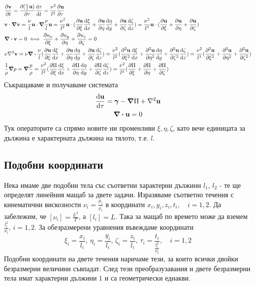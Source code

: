 \begin{align}
	&\pdv{\mathbf{v}}{t} = \pdv{(\frac{\nu}{l}\mathbf{u})}{\tau}\dv{\tau}{t} = \frac{\nu^2}{l^3} \pdv{\mathbf{u}}{\tau} \\
	&\mathbf{v} \cdot \grad \mathbf{v} = 
		\frac{\nu}{l} \mathbf{u} \cdot \grad \frac{\nu}{l} \mathbf{u} = 
		\frac{\nu^2}{l^2} \mathbf{u} \cdot (\pdv{\mathbf{u}}{\xi}\dv{\xi}{x} + \pdv{\mathbf{u}}{\eta}\dv{\eta}{y} + \pdv{\mathbf{u}}{\zeta}\dv{\zeta}{z}) =
		\frac{\nu^2}{l^3} \mathbf{u} \cdot (\pdv{\mathbf{u}}{\xi} + \pdv{\mathbf{u}}{\eta} + \pdv{\mathbf{u}}{\zeta}) \\
	& \div \mathbf{v} = 0 \iff \pdv{u_x}{\xi} + \pdv{u_y}{\eta} + \pdv{u_z}{\zeta} = 0 \\
	& \nu \laplacian \mathbf{v} = 
		\nu \div \frac{\nu}{l} (\pdv{\mathbf{u}}{\xi}\dv{\xi}{x} + \pdv{\mathbf{u}}{\eta}\dv{\eta}{y} + \pdv{\mathbf{u}}{\zeta}\dv{\zeta}{z}) = 
		\frac{\nu^2}{l^2} (\pdv[2]{\mathbf{u}}{\xi}\dv{\xi}{x} + \pdv[2]{\mathbf{u}}{\eta}\dv{\eta}{y} + \pdv[2]{\mathbf{u}}{\zeta}\dv{\zeta}{z}) =
		\frac{\nu^2}{l^3} (\pdv[2]{\mathbf{u}}{\xi} + \pdv[2]{\mathbf{u}}{\eta} + \pdv[2]{\mathbf{u}}{\zeta}) \\
	&\frac{1}{\rho}\grad p = 
		\grad \frac{p}{\rho} =
	 	\frac{\nu^2}{l^2} (\pdv{\Pi}{\xi}\dv{\xi}{x} + \pdv{\Pi}{\eta}\dv{\eta}{y} + \pdv{\Pi}{\zeta}\dv{\zeta}{z}) =
		\frac{\nu^2}{l^3} (\pdv{\Pi}{\xi} + \pdv{\Pi}{\eta} + \pdv{\Pi}{\zeta})
\end{align}
Съкращаваме и получаваме системата
\begin{gather}
	\dv{\mathbf{u}}{\tau} = \bm{\gamma} - \grad \Pi + \laplacian \mathbf{u} \\\nonumber
	\div \mathbf{u} = 0
\end{gather}
Тук операторите са спрямо новите ни променливи $\xi, \eta, \zeta$, като вече единицата за дължина е характерната дължина на тялото, т.е. $l$.

\subsection{Подобни координати}
Нека имаме две подобни тела със съответни характерни дължини $l_1$, $l_2$ - те ще определят линейния мащаб за двете задачи. 
Изразяваме съответно течения с кинематични вискозности $\nu_i = \frac{\mu_i}{\rho_i}$ в координати $x_i,y_i,z_i,t_i, \quad i=1,2$.
Да забележим, че $[\nu_i]=\frac{L^2}{T}$, а $[l_i]=L$.
Така за мащаб по времето може да вземем $\frac{l_i^2}{\nu_i},\, i=1,2$. 
За обезразмерени уравнения въвеждаме координати
\begin{equation}
	\xi_i = \frac{x_i}{l_i},\, \eta_i = \frac{y_i}{l_i},\, \zeta_i = \frac{z_i}{l_i},\, \tau_i = \frac{t_i}{\frac{l_i^2}{\nu_i}}, \quad i=1,2
\end{equation}
Подобни координати на двете течения наричаме тези, за които всички двойки безразмерни величини съвпадат.
След тези преобразузавания и двете безразмерни тела имат характерни дължини $1$ и са геометрически еднакви. 
